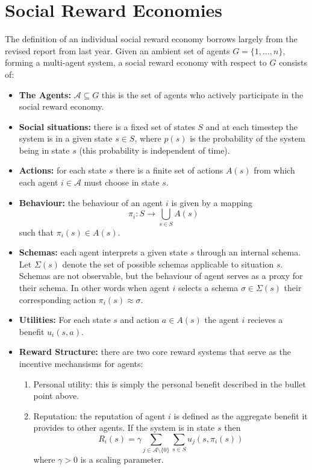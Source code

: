 \documentclass[12pt]{article}
\begin{document}
\section{Social Reward Economies}
The definition of an individual social reward economy borrows largely from the revised report from last year.
Given an ambient set of agents $G = \{ 1, \ldots, n \}$, forming a multi-agent system,
a social reward economy with respect to $G$ consists of:
\begin{itemize}
    \item \textbf{The Agents:} $\mathcal A \subseteq G$ this is the set of agents who actively participate in the social reward economy.
    \item \textbf{Social situations:} there is a fixed set of states $S$ and at each timestep the system is in a given state $s \in S$,
    where $p(s)$ is the probability of the system being in state $s$ (this probability is independent of time).
    \item \textbf{Actions:} for each state $s$ there is a finite set of actions $A(s)$ from which
    each agent $i \in \mathcal A$ must choose in state $s$.
    \item \textbf{Behaviour:} the behaviour of an agent $i$ is given by a mapping
    \[ \pi_i: S \to \bigcup_{s \in S}A(s) \]
    such that $\pi_i(s) \in A(s)$.
    \item \textbf{Schemas:} each agent interprets a given state $s$ through an internal schema.
    Let $\Sigma(s)$ denote the set of possible schemas applicable to situation $s$. Schemas
    are not observable, but the behaviour of agent serves as a proxy for their schema. In other words
    when agent $i$ selects a schema $\sigma \in \Sigma(s)$ their corresponding action $\pi_i(s) \approx \sigma$.
    \item \textbf{Utilities:} For each state $s$ and action $a \in A(s)$ the agent $i$ recieves a benefit $u_i(s, a)$.
    \item \textbf{Reward Structure:} there are two core reward systems that serve as the incentive mechansisms for agents:
    \begin{enumerate}
        \item[(1)] Personal utility: this is simply the personal benefit described in the bullet point above.
        \item[(2)] Reputation: the reputation of agent $i$ is defined as the aggregate benefit it provides to other agents.
        If the system is in state $s$ then
        \[ R_i(s) = \gamma \sum_{j \in \mathcal A \setminus \{ 0 \}} \sum_{s \in S}u_j(s, \pi_i(s)) \]
        where $\gamma > 0$ is a scaling parameter.
    \end{enumerate}


\end{itemize}
\end{document}
